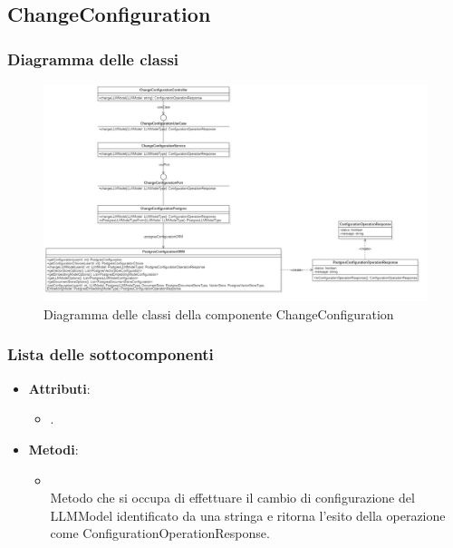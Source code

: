 \documentclass[10pt, a4paper]{article}
\begin{document}
 \subsection{ChangeConfiguration}
 \subsubsection{Diagramma delle classi}

 \begin{figure}[H]
    \centering        
    \includegraphics[width=17cm]{img/ChangeConfiguration.png}
    \caption{Diagramma delle classi della componente ChangeConfiguration}
\end{figure}



 \subsubsection{Lista delle sottocomponenti}
 


\label{ChangeConfigurationControllerDettaglio}
\begin{itemize}
    \item \textbf{Attributi}:
    \begin{itemize}
        \item {}.
    \end{itemize}
    \item \textbf{Metodi}:
    \begin{itemize}
        \item {}\\
        Metodo che si occupa di effettuare il cambio di configurazione del LLMModel identificato da una stringa e ritorna l'esito della operazione come ConfigurationOperationResponse.
    \end{itemize}
\end{itemize}
\end{document}
